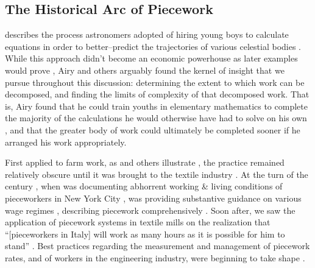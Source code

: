\documentclass[trackingWork]{subfiles}
\begin{document}
\subsection{The Historical Arc of Piecework}\label{sec:pieceworkArc}

\citeauthor{grier2013computers} describes the process astronomers adopted of hiring young boys
to calculate equations in order to better--predict the trajectories of various celestial bodies
\cite{grier2013computers}. 
While this approach didn't become an economic powerhouse as later examples would prove%
, Airy and others arguably found the kernel of insight that we pursue throughout this discussion:
determining the extent to which work can be decomposed, and
finding the limits of complexity of that decomposed work.
That is, Airy found that he could train youths in elementary mathematics
to complete the majority of the calculations he would otherwise have had to solve on his own%
, and that the greater body of work could ultimately be completed sooner
if he arranged his work appropriately.

 
First applied to farm work, as
\citeauthor{hughRaynbirdTaskWork} and others illustrate%
, the practice remained relatively obscure until
it was brought to the textile industry
\cite{hughRaynbirdTaskWork}.
At the turn of the  century%
, when \citeauthor{riisOtherSideLives} was documenting abhorrent working \& living conditions of pieceworkers in New York City%
, \citeauthor{norton1900textile} was providing substantive guidance on various wage regimes%
, describing piecework comprehensively 
\cite{riisOtherSideLives,norton1900textile}.
Soon after,
we saw the application of piecework systems in textile mills on the realization that
``[pieceworkers in Italy] will work as many hours as it is possible for him to stand''
\cite{clark1908cotton}.
Best practices regarding the measurement and management of
piecework rates, and of workers in the engineering industry,
were beginning to take shape
\cite{burton1899commercial}.
\end{document}
